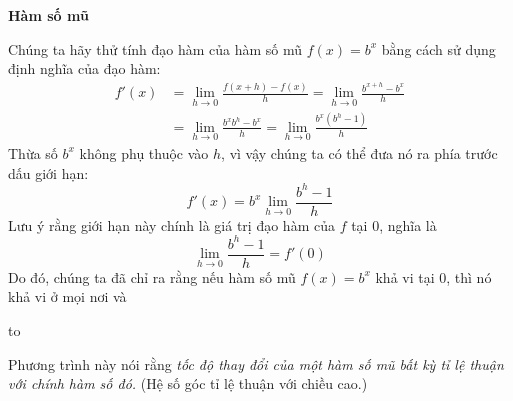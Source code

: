 \begin{minipage}[t]{0.71\textwidth}
  \vspace{1.6em}
  \noindent{\color{stewartcyan}\rule{1.1ex}{1.1ex}}\hspace{0.6em}\textbf{\textsf{\large Hàm số mũ}}

  \vspace{0.7em}
  \noindent Chúng ta hãy thử tính đạo hàm của hàm số mũ $f(x) = b^x$ bằng cách sử dụng định nghĩa của đạo hàm:
  \begin{align*}
  f'(x) &= \lim_{h \to 0} \frac{f(x + h) - f(x)}{h} = \lim_{h \to 0} \frac{b^{x+h} - b^x}{h} \\[6pt]
  &= \lim_{h \to 0} \frac{b^x b^h - b^x}{h} = \lim_{h \to 0} \frac{b^x(b^h - 1)}{h}
  \end{align*}
  Thừa số $b^x$ không phụ thuộc vào $h$, vì vậy chúng ta có thể đưa nó ra phía trước dấu giới hạn:
  \[
  f'(x) = b^x \lim_{h \to 0} \frac{b^h - 1}{h}
  \]
  Lưu ý rằng giới hạn này chính là giá trị đạo hàm của $f$ tại $0$, nghĩa là
  \[
  \lim_{h \to 0} \frac{b^h - 1}{h} = f'(0)
  \]
  Do đó, chúng ta đã chỉ ra rằng nếu hàm số mũ $f(x) = b^x$ khả vi tại $0$, thì nó khả vi ở mọi nơi và

  \vspace{0.5em}
  \noindent\hbox to 

  \vspace{0.8em}
  \noindent Phương trình này nói rằng \textit{tốc độ thay đổi của một hàm số mũ bất kỳ tỉ lệ thuận với chính hàm số đó.} (Hệ số góc tỉ lệ thuận với chiều cao.)
\end{minipage}
